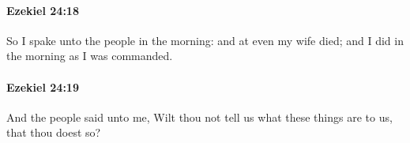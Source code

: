		\paragraph{Ezekiel 24:18} %
			\label{EZEKIEL-24-18}

			So I spake unto the people in the morning: and at even my wife died; and I did in the morning as I was commanded.


		\paragraph{Ezekiel 24:19} %
			\label{EZEKIEL-24-19}

			And the people said unto me, Wilt thou not tell us what these things are to us, that thou doest so?


